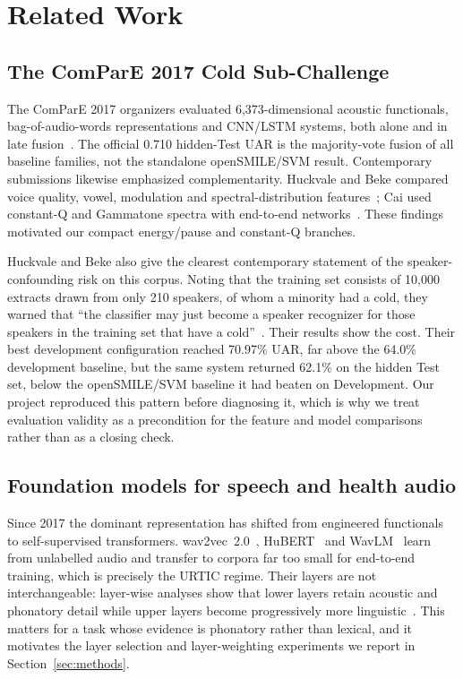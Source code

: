 \section{Related Work}
\label{sec:related}

\subsection{The ComParE 2017 Cold Sub-Challenge}

The ComParE 2017 organizers evaluated 6,373-dimensional acoustic
functionals, bag-of-audio-words representations and CNN/LSTM systems, both
alone and in late fusion~\cite{schuller2017interspeech}. The official 0.710
hidden-Test UAR is the majority-vote fusion of all baseline families, not the
standalone openSMILE/SVM result. Contemporary submissions likewise emphasized
complementarity. Huckvale and Beke compared voice quality, vowel, modulation
and spectral-distribution features~\cite{huckvale2017cold}; Cai \etal used
constant-Q and Gammatone spectra with end-to-end networks~\cite{cai2017cold}.
These findings motivated our compact energy/pause and constant-Q branches.

Huckvale and Beke also give the clearest contemporary statement of the
speaker-confounding risk on this corpus. Noting that the training set consists
of 10,000 extracts drawn from only 210 speakers, of whom a minority had a cold,
they warned that ``the classifier may just become a speaker recognizer for
those speakers in the training set that have a cold''~\cite{huckvale2017cold}.
Their results show the cost. Their best development configuration reached
70.97\% UAR, far above the 64.0\% development baseline, but the same system
returned 62.1\% on the hidden Test set, below the openSMILE/SVM baseline it had
beaten on Development. Our project reproduced this pattern before diagnosing
it, which is why we treat evaluation validity as a precondition for the
feature and model comparisons rather than as a closing check.

\subsection{Foundation models for speech and health audio}

Since 2017 the dominant representation has shifted from engineered functionals
to self-supervised transformers. wav2vec~2.0~\cite{baevski2020wav2vec2},
HuBERT~\cite{hsu2021hubert} and WavLM~\cite{chen2022wavlm} learn from
unlabelled audio and transfer to corpora far too small for end-to-end
training, which is precisely the URTIC regime. Their layers are not
interchangeable: layer-wise analyses show that lower layers retain acoustic
and phonatory detail while upper layers become progressively more
linguistic~\cite{pasad2021layer}. This matters for a task whose evidence is
phonatory rather than lexical, and it motivates the layer selection and
layer-weighting experiments we report in Section~\ref{sec:methods}.

